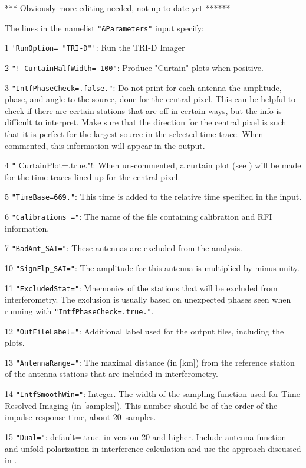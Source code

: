 *** Obviously more editing needed, not up-to-date yet ******

The lines in the namelist \verb!"&Parameters"! input specify:
\begin{enumerate*}
\item[1] \verb!'RunOption= "TRI-D"'!: Run the TRI-D Imager
\item[2] \verb#"! CurtainHalfWidth= 100"#: Produce "Curtain" plots when positive.
\item[3] \verb#"IntfPhaseCheck=.false."#: Do not print for each antenna the amplitude, phase, and angle to the source, done for the central pixel. This can be helpful to check if there are certain stations that are off in certain ways, but the info is difficult to interpret. Make sure that the direction for the central pixel is such that it is perfect for the largest source in the selected time trace. When commented, this information will appear in the output.
\item[4] \verb!"! CurtainPlot=.true."!: When un-commented, a curtain plot (see ) will be made for the time-traces lined up for the central pixel.
\item[5] \verb!"TimeBase=669."!: This time is added to the relative time specified in the input.
\item[6] \verb!"Calibrations ="!: The name of the file containing calibration and RFI information.
\item[7] \verb!"BadAnt_SAI="!: These antennas are excluded from the analysis.
\item[10] \verb!"SignFlp_SAI="!: The amplitude for this antenna is multiplied by minus unity.
\item[11] \verb!"ExcludedStat="!: Mnemonics of the stations that will be excluded from interferometry. The exclusion is usually based on unexpected phases seen when running with \verb!"IntfPhaseCheck=.true."!.
\item[12] \verb!"OutFileLabel="!: Additional label used for the output files, including the plots.
\item[13] \verb!"AntennaRange="!: The maximal distance (in [km]) from the reference station of the antenna stations that are included in interferometry.
\item[14] \verb!"IntfSmoothWin="!: Integer. The width of the sampling function used for Time Resolved Imaging (in [samples]). This number should be of the order of the impulse-response time, about 20~samples.
\item[15] \verb!"Dual="!: default=.true. in version 20 and higher. Include antenna function and unfold polarization in interference calculation and use the approach discussed in .

\end{enumerate*}
